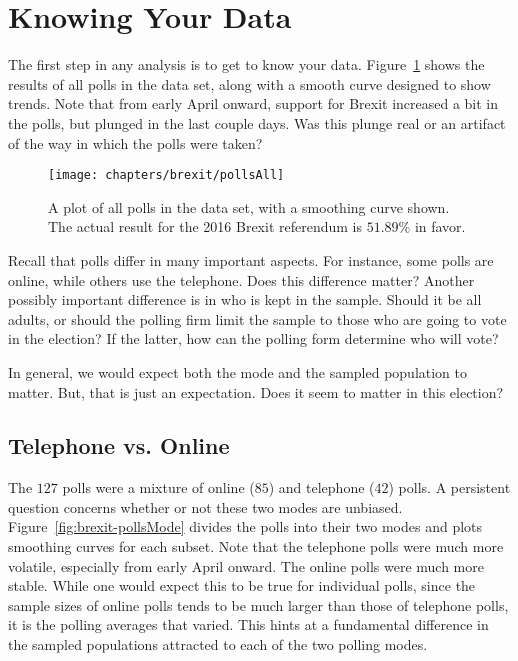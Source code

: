 









\section{Knowing Your Data}
The first step in any analysis is to get to know your data. Figure~\ref{fig:brexit-pollsAll} shows the results of all polls in the data set, along with a smooth curve designed to show trends. Note that from early April onward, support for Brexit increased a bit in the polls, but plunged in the last couple days. Was this plunge real or an artifact of the way in which the polls were taken?

\begin{figure}\centering
 \texttt{[image: chapters/brexit/pollsAll]}
 \caption[All Brexit-2016 polls]{A plot of all polls in the data set, with a smoothing curve shown. The actual result for the 2016 Brexit referendum is $51.89\%$ in favor.}
 \label{fig:brexit-pollsAll}
\end{figure}

Recall that polls differ in many important aspects. For instance, some polls are online, while others use the telephone. Does this difference matter? Another possibly important difference is in who is kept in the sample. Should it be all adults, or should the polling firm limit the sample to those who are going to vote in the election? If the latter, how can the polling form determine who will vote?

In general, we would expect both the mode and the sampled population to matter. But, that is just an expectation. Does it seem to matter in this election? 








\subsection{Telephone vs. Online}
The $127$ polls were a mixture of online ($85$) and telephone ($42$) polls. A persistent question concerns whether or not these two modes are unbiased. Figure~\ref{fig:brexit-pollsMode} divides the polls into their two modes and plots smoothing curves for each subset. Note that the telephone polls were much more volatile, especially from early April onward. The online polls were much more stable. While one would expect this to be true for individual polls, since the sample sizes of online polls tends to be much larger than those of telephone polls, it is the polling averages that varied. This hints at a fundamental difference in the sampled populations attracted to each of the two polling modes.

